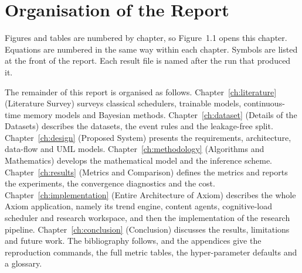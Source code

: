 \section{Organisation of the Report}
\label{sec:intro-organisation}

Figures and tables are numbered by chapter, so Figure~1.1 opens this chapter. Equations
are numbered in the same way within each chapter. Symbols are listed at the front of the report. Each result file is named after the run that produced it.

The remainder of this report is organised as follows. Chapter~\ref{ch:literature} (Literature Survey) surveys classical schedulers, trainable models, continuous-time memory models and Bayesian methods. Chapter~\ref{ch:dataset} (Details of the Datasets) describes the datasets, the event rules and the leakage-free split. Chapter~\ref{ch:design} (Proposed System) presents the requirements, architecture, data-flow and UML models. Chapter~\ref{ch:methodology} (Algorithms and Mathematics) develops the mathematical model and the inference scheme. Chapter~\ref{ch:results} (Metrics and Comparison) defines the metrics and reports the experiments, the convergence diagnostics and the cost. Chapter~\ref{ch:implementation} (Entire Architecture of Axiom) describes the whole Axiom application, namely its trend engine, content agents, cognitive-load scheduler and research workspace, and then the implementation of the research pipeline. Chapter~\ref{ch:conclusion} (Conclusion) discusses the results, limitations and future work. The bibliography follows, and the appendices give the reproduction commands, the full metric tables, the hyper-parameter defaults and a glossary.

